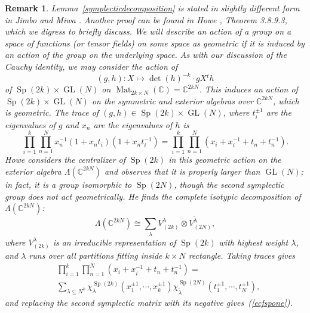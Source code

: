 \documentclass[11pt]{amsart}
\newcommand{\tmem}[1]{{\em #1\/}}
\newcommand{\tmop}[1]{\ensuremath{\operatorname{#1}}}
\newtheorem{varremark}{Remark}
\newenvironment{remark}{\begin{varremark}\em}{\em\end{varremark}}
\begin{document}
\begin{remark}
  Lemma~\ref{symplecticdecomposition} is stated in slightly different form in
  Jimbo and Miwa {\cite{JM}}. Another proof can be found in Howe
  {\cite{HowePerspectives}}, Theorem 3.8.9.3, which we digress to briefly
  discuss. We will describe an action of a group on a space of functions (or
  tensor fields) on some space as {\tmem{geometric}} if it is induced by an
  action of the group on the underlying space. As with our discussion of the
  Cauchy identity, we may consider the action of
  \[ ( g, h ) : X \longmapsto \det ( h )^{- k} \cdot g X {^t h} \]
  of $\tmop{Sp} ( 2 k ) \times \tmop{GL} ( N )$ on $\tmop{Mat}_{2 k \times N}
  (\mathbb{C}) =\mathbb{C}^{2 k N}$. This induces an action of $\tmop{Sp} (
  2 k ) \times \tmop{GL} ( N )$ on the symmetric and exterior algebras over
  $\mathbb{C}^{2 k N}$, which is geometric. The trace of $( g, h ) \in
  \tmop{Sp} ( 2 k ) \times \tmop{GL} ( N )$, where $t_i^{\pm 1}$ are the
  eigenvalues of $g$ and $x_n$ are the eigenvalues of $h$ is
  \[ \prod_{i = 1}^k \prod_{n = 1}^N x_n^{- 1} ( 1 + x_n t_i ) ( 1 + x_n
     t_i^{- 1} ) = \prod_{i = 1}^k \prod_{n = 1}^N ( x_i + x_i^{- 1} + t_n +
     t_n^{- 1} ) . \]
  Howe considers the centralizer of $\tmop{Sp} ( 2 k )$ in this geometric
  action on the exterior algebra $\Lambda (\mathbb{C}^{2 k N} )$ and observes
  that it is properly larger than $\tmop{GL} ( N )$; in fact, it is a group
  isomorphic to $\tmop{Sp} ( 2 N )$, though the second symplectic group does
  not act geometrically. He finds the complete isotypic decomposition of
  $\Lambda (\mathbb{C}^{2 k N} )$:
  \begin{equation}
    \label{hosp} \Lambda (\mathbb{C}^{2 k N} ) \cong \sum_{\lambda}
    V^{\lambda}_{( 2 k )} \otimes V^{\tilde{\lambda}}_{( 2 N )},
  \end{equation}
  where $V^{\lambda}_{( 2 k )}$ is an irreducible representation of $\tmop{Sp}
  ( 2 k )$ with highest weight $\lambda$, and $\lambda$ runs over all
  partitions fitting inside $k \times N$ rectangle. Taking traces gives
  \begin{equation}\label{good}
  \begin{aligned}
&    \prod_{i = 1}^k \prod_{n = 1}^N ( x_i + x_i^{- 1} + t_n +
t_n^{- 1} )
    =\\
&    \sum_{\lambda \subseteq N^k} \chi_{\lambda}^{\tmop{Sp} ( 2 k
)} ( x_1^{\pm
    1}, \cdots, x_k^{\pm 1} ) \chi_{\tilde{\lambda}}^{\tmop{Sp} ( 2 N )} (
    t_1^{\pm 1}, \cdots, t_N^{\pm 1} ),
    \end{aligned}
  \end{equation}
  and replacing the second symplectic matrix with its negative
  gives~(\ref{ecfspone}).
\end{remark}
\end{document}
